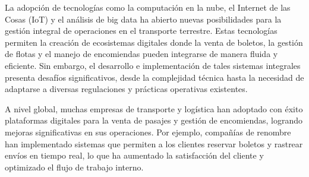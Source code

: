 	
	La adopción de tecnologías como la computación en la nube, el Internet de las Cosas (IoT) y el análisis de big data ha abierto nuevas posibilidades para la gestión integral de operaciones en el transporte terrestre. Estas tecnologías permiten la creación de ecosistemas digitales donde la venta de boletos, la gestión de flotas y el manejo de encomiendas pueden integrarse de manera fluida y eficiente. Sin embargo, el desarrollo e implementación de tales sistemas integrales presenta desafíos significativos, desde la complejidad técnica hasta la necesidad de adaptarse a diversas regulaciones y prácticas operativas existentes.
	
	A nivel global, muchas empresas de transporte y logística han adoptado con éxito plataformas digitales para la venta de pasajes y gestión de encomiendas, logrando mejoras significativas en sus operaciones. Por ejemplo, compañías de renombre han implementado sistemas que permiten a los clientes reservar boletos y rastrear envíos en tiempo real, lo que ha aumentado la satisfacción del cliente y optimizado el flujo de trabajo interno.
	
	

